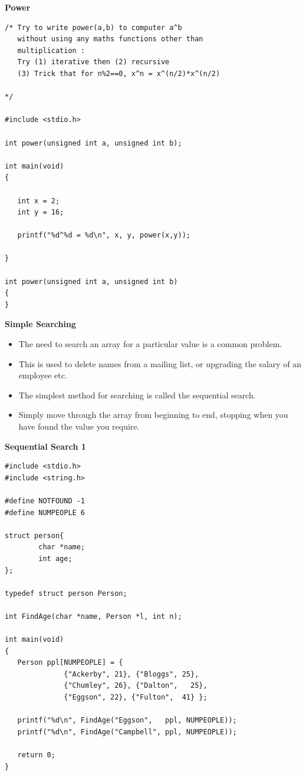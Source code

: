 \documentclass[a4,portraitt]{slides}
\begin{document}
\newpage
{\samepage
\begin{center}
{\Large{\bf Power}}
\end{center}
{\small
\begin{verbatim}
/* Try to write power(a,b) to computer a^b
   without using any maths functions other than
   multiplication :
   Try (1) iterative then (2) recursive
   (3) Trick that for n%2==0, x^n = x^(n/2)*x^(n/2)

*/

#include <stdio.h>

int power(unsigned int a, unsigned int b);

int main(void)
{

   int x = 2;
   int y = 16;

   printf("%d^%d = %d\n", x, y, power(x,y));

}

int power(unsigned int a, unsigned int b)
{
}
\end{verbatim}
}}

\newpage
{\samepage
\begin{center}
{\Large{\bf Simple Searching}}
\end{center}
{\large
\begin{itemize}
\item The need to search an array for a particular value is a common problem.
\item This is used to delete names from a mailing list,
or upgrading the salary of an employee etc.
\item The simplest method for searching is called the sequential search.
\item Simply move through the array from beginning to end,
stopping when you have found the value you require.
\end{itemize}
}
}

\newpage
{\samepage
\begin{center}
{\Large{\bf Sequential Search 1}}
\end{center}
{\small
\begin{verbatim}
#include <stdio.h>
#include <string.h>

#define NOTFOUND -1
#define NUMPEOPLE 6

struct person{
        char *name;
        int age;
};

typedef struct person Person;

int FindAge(char *name, Person *l, int n);

int main(void)
{
   Person ppl[NUMPEOPLE] = {
              {"Ackerby", 21}, {"Bloggs", 25},
              {"Chumley", 26}, {"Dalton",   25},
              {"Eggson", 22}, {"Fulton",  41} };

   printf("%d\n", FindAge("Eggson",   ppl, NUMPEOPLE));
   printf("%d\n", FindAge("Campbell", ppl, NUMPEOPLE));

   return 0;
}
\end{verbatim}
}}
\end{document}
